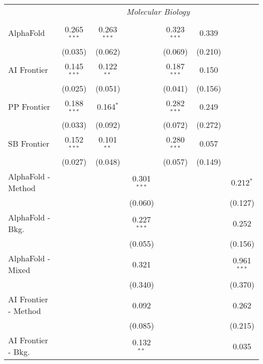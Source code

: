 \begin{tabular}{lcccccc}
 & \multicolumn{6}{c}{\textit{Molecular Biology}} \\ \\
   AlphaFold            & 0.265$^{***}$ & 0.263$^{***}$ &               & 0.323$^{***}$ & 0.339   &   \\   
                        & (0.035)       & (0.062)       &               & (0.069)       & (0.210) &   \\   
   AI Frontier          & 0.145$^{***}$ & 0.122$^{**}$  &               & 0.187$^{***}$ & 0.150   &   \\   
                        & (0.025)       & (0.051)       &               & (0.041)       & (0.156) &   \\   
   PP Frontier          & 0.188$^{***}$ & 0.164$^{*}$   &               & 0.282$^{***}$ & 0.249   &   \\   
                        & (0.033)       & (0.092)       &               & (0.072)       & (0.272) &   \\   
   SB Frontier          & 0.152$^{***}$ & 0.101$^{**}$  &               & 0.280$^{***}$ & 0.057   &   \\   
                        & (0.027)       & (0.048)       &               & (0.057)       & (0.149) &   \\   
   AlphaFold - Method   &               &               & 0.301$^{***}$ &               &         & 0.212$^{*}$\\   
                        &               &               & (0.060)       &               &         & (0.127)\\   
   AlphaFold - Bkg.     &               &               & 0.227$^{***}$ &               &         & 0.252\\   
                        &               &               & (0.055)       &               &         & (0.156)\\   
   AlphaFold - Mixed    &               &               & 0.321         &               &         & 0.961$^{***}$\\   
                        &               &               & (0.340)       &               &         & (0.370)\\   
   AI Frontier - Method &               &               & 0.092         &               &         & 0.262\\   
                        &               &               & (0.085)       &               &         & (0.215)\\   
   AI Frontier - Bkg.   &               &               & 0.132$^{**}$  &               &         & 0.035\\   

\end{tabular}

